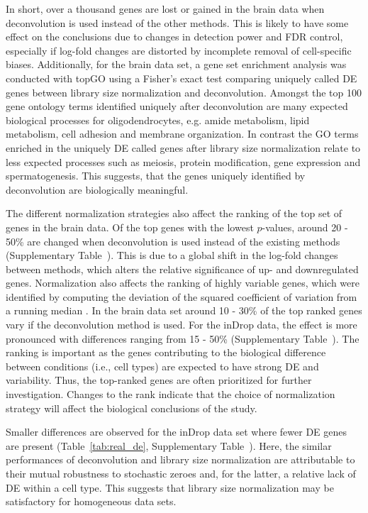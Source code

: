 \documentclass{article}
\begin{document}
In short, over a thousand genes are lost or gained in the brain data when deconvolution is used instead of the other methods.
This is likely to have some effect on the conclusions due to changes in detection power and FDR control, 
    especially if log-fold changes are distorted by incomplete removal of cell-specific biases.
Additionally, for the brain data set, a gene set enrichment analysis was conducted with topGO \cite{topGO} using a Fisher's exact test comparing uniquely called DE genes between library size normalization and deconvolution. 
Amongst the top 100 gene ontology terms identified uniquely after deconvolution are many expected biological processes for oligodendrocytes, e.g. amide metabolism, lipid metabolism, cell adhesion and membrane organization.
In contrast the GO terms enriched in the uniquely DE called genes after library size normalization relate to less expected processes such as meiosis, protein modification, gene expression and spermatogenesis.
This suggests, that the genes uniquely identified by deconvolution are biologically meaningful.

The different normalization strategies also affect the ranking of the top set of genes in the brain data.
Of the top genes with the lowest $p$-values, around 20 - 50\% are changed when deconvolution is used instead of the existing methods (Supplementary Table~\supprank{}).
This is due to a global shift in the log-fold changes between methods, which alters the relative significance of up- and downregulated genes.
Normalization also affects the ranking of highly variable genes, which were identified by computing the deviation of the squared coefficient of variation from a running median \cite{Kim2015}.
In the brain data set around 10 - 30\% of the top ranked genes vary if the deconvolution method is used.
For the inDrop data, the effect is more pronounced with differences ranging from 15 - 50\% (Supplementary Table~\suppHVG{}).
The ranking is important as the genes contributing to the biological difference between conditions (i.e., cell types) are expected to have strong DE and variability.
Thus, the top-ranked genes are often prioritized for further investigation.
Changes to the rank indicate that the choice of normalization strategy will affect the biological conclusions of the study.

Smaller differences are observed for the inDrop data set where fewer DE genes are present (Table~\ref{tab:real_de}, Supplementary Table~\supprank{}).
Here, the similar performances of deconvolution and library size normalization are attributable to their mutual robustness to stochastic zeroes and, for the latter, a relative lack of DE within a cell type.
This suggests that library size normalization may be satisfactory for homogeneous data sets.
\end{document}

